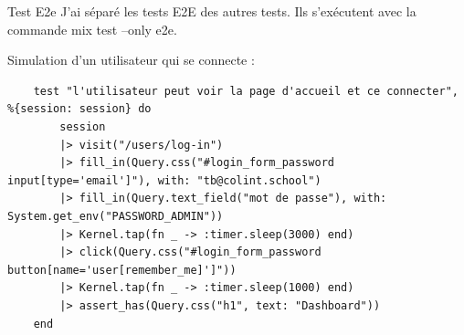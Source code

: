 \begin{for_you}{Test E2e}
    J’ai séparé les tests E2E des autres tests. Ils s’exécutent avec la commande mix test --only e2e. \newline

    Simulation d'un utilisateur qui se connecte :
    
        \begin{lstlisting}
    test "l'utilisateur peut voir la page d'accueil et ce connecter", %{session: session} do
        session
        |> visit("/users/log-in")
        |> fill_in(Query.css("#login_form_password input[type='email']"), with: "tb@colint.school")
        |> fill_in(Query.text_field("mot de passe"), with: System.get_env("PASSWORD_ADMIN"))
        |> Kernel.tap(fn _ -> :timer.sleep(3000) end)
        |> click(Query.css("#login_form_password button[name='user[remember_me]']"))
        |> Kernel.tap(fn _ -> :timer.sleep(1000) end)
        |> assert_has(Query.css("h1", text: "Dashboard"))
    end
    \end{lstlisting}

\end{for_you}